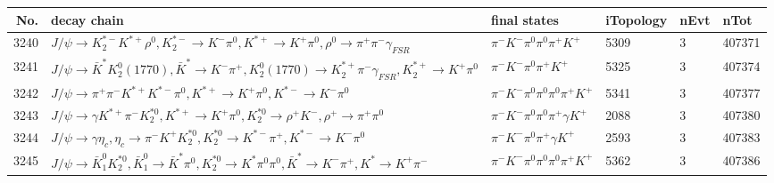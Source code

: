\begin{table}[htbp] 
\begin{center}
\begin{small}
\begin{tabular}{rlllll}\hline\hline
 No. & decay chain & final states &  iTopology & nEvt & nTot \\\hline
3240&$J/\psi       \rightarrow K_2^{*-}       K^{*+}         \rho^{0}      , K_2^{*-}        \rightarrow K^{-}          \pi^{0}        , K^{*+}          \rightarrow K^{+}          \pi^{0}        , \rho^{0}       \rightarrow \pi^{+}        \pi^{-}        \gamma_{FSR} $&$\pi^{-}        K^{-}          \pi^{0}        \pi^{0}        \pi^{+}        K^{+}          $& 5309&    3&407371\\
3241&$J/\psi       \rightarrow \bar{K}^{*}   K_2^0(1770)    , \bar{K}^{*}    \rightarrow K^{-}          \pi^{+}        , K_2^0(1770)     \rightarrow K_2^{*+}       \pi^{-}        \gamma_{FSR} , K_2^{*+}        \rightarrow K^{+}          \pi^{0}        $&$\pi^{-}        K^{-}          \pi^{0}        \pi^{+}        K^{+}          $& 5325&    3&407374\\
3242&$J/\psi       \rightarrow \pi^{+}        \pi^{-}        K^{*+}         K^{*-}         \pi^{0}        , K^{*+}          \rightarrow K^{+}          \pi^{0}        , K^{*-}          \rightarrow K^{-}          \pi^{0}        $&$\pi^{-}        K^{-}          \pi^{0}        \pi^{0}        \pi^{0}        \pi^{+}        K^{+}          $& 5341&    3&407377\\
3243&$J/\psi       \rightarrow \gamma       K^{*+}         \pi^{-}        K_2^{*0}       , K^{*+}          \rightarrow K^{+}          \pi^{0}        , K_2^{*0}        \rightarrow \rho^{+}      K^{-}          , \rho^{+}       \rightarrow \pi^{+}        \pi^{0}        $&$\pi^{-}        K^{-}          \pi^{0}        \pi^{0}        \pi^{+}        \gamma       K^{+}          $& 2088&    3&407380\\
3244&$J/\psi       \rightarrow \gamma       \eta_{c}    , \eta_{c}     \rightarrow \pi^{-}        K^{+}          K_2^{*0}       , K_2^{*0}        \rightarrow K^{*-}         \pi^{+}        , K^{*-}          \rightarrow K^{-}          \pi^{0}        $&$\pi^{-}        K^{-}          \pi^{0}        \pi^{+}        \gamma       K^{+}          $& 2593&    3&407383\\
3245&$J/\psi       \rightarrow \bar{K}_1^{0} K_2^{*0}       , \bar{K}_1^{0}  \rightarrow \bar{K}^{*}   \pi^{0}        , K_2^{*0}        \rightarrow K^{*}          \pi^{0}        \pi^{0}        , \bar{K}^{*}    \rightarrow K^{-}          \pi^{+}        , K^{*}           \rightarrow K^{+}          \pi^{-}        $&$\pi^{-}        K^{-}          \pi^{0}        \pi^{0}        \pi^{0}        \pi^{+}        K^{+}          $& 5362&    3&407386\\

\end{tabular}
\end{small}
\end{center}
\end{table}
